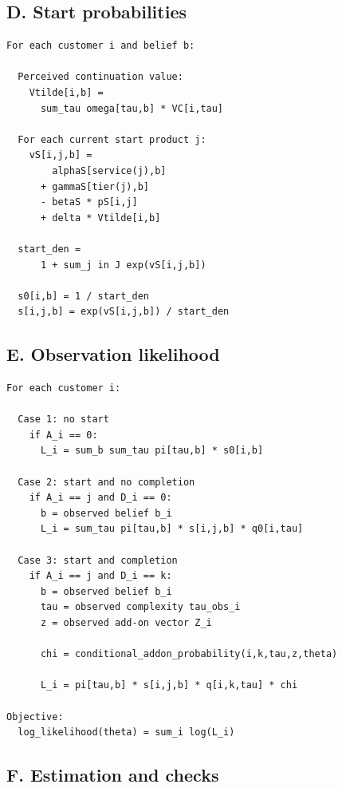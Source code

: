 \documentclass[11pt]{article}
\begin{document}
\subsection*{D. Start probabilities}

\begin{Verbatim}[fontsize=\small, frame=single]
For each customer i and belief b:

  Perceived continuation value:
    Vtilde[i,b] =
      sum_tau omega[tau,b] * VC[i,tau]

  For each current start product j:
    vS[i,j,b] =
        alphaS[service(j),b]
      + gammaS[tier(j),b]
      - betaS * pS[i,j]
      + delta * Vtilde[i,b]

  start_den =
      1 + sum_j in J exp(vS[i,j,b])

  s0[i,b] = 1 / start_den
  s[i,j,b] = exp(vS[i,j,b]) / start_den
\end{Verbatim}

\subsection*{E. Observation likelihood}

\begin{Verbatim}[fontsize=\small, frame=single]
For each customer i:

  Case 1: no start
    if A_i == 0:
      L_i = sum_b sum_tau pi[tau,b] * s0[i,b]

  Case 2: start and no completion
    if A_i == j and D_i == 0:
      b = observed belief b_i
      L_i = sum_tau pi[tau,b] * s[i,j,b] * q0[i,tau]

  Case 3: start and completion
    if A_i == j and D_i == k:
      b = observed belief b_i
      tau = observed complexity tau_obs_i
      z = observed add-on vector Z_i

      chi = conditional_addon_probability(i,k,tau,z,theta)

      L_i = pi[tau,b] * s[i,j,b] * q[i,k,tau] * chi

Objective:
  log_likelihood(theta) = sum_i log(L_i)
\end{Verbatim}

\newpage
\subsection*{F. Estimation and checks}
\end{document}

